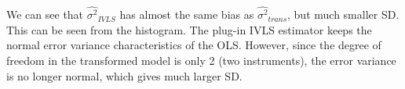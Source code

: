 \documentclass{article}
\begin{document}
We can see that $\hat{\sigma^2}_{IVLS}$ has almost the same bias as
$\hat{\sigma^2}_{trans}$,  but much smaller SD. This can be seen from
the histogram. The plug-in IVLS estimator keeps the normal error variance
characteristics of the OLS. However, since the degree of freedom in
the transformed model is only 2 (two instruments), the error variance
is no longer normal, which gives much larger SD.


\end{document}
